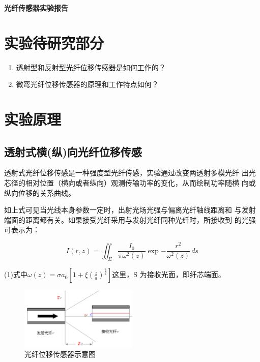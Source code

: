 \documentclass[a4paper,UTF8]{ctexart}
\begin{document}
\begin{center}
    \textbf{\Large 光纤传感器实验报告}
    \par {}
\end{center}

\section{实验待研究部分}

\begin{enumerate}
    \item 透射型和反射型光纤位移传感器是如何工作的？
    \item 微弯光纤位移传感器的原理和工作特点如何？
\end{enumerate}

\section{实验原理}

\subsection{透射式横(纵)向光纤位移传感}

透射式光纤位移传感是一种强度型光纤传感，实验通过改变两透射多模光纤
出光芯径的相对位置（横向或者纵向）观测传输功率的变化，从而绘制功率随横
向或纵向位移的关系曲线。

如上式可见当光线本身参数一定时，出射光场光强与偏离光纤轴线距离和
与发射端面的距离都有关。如果接受光纤采用与发射光纤同种光纤时，所接收到
的光强可表示为：

\begin{equation}
    I(r,z) = \iint_{\Sigma} \frac{I_0}{\pi \omega^2(z)} \exp{- \frac{r^2}{\omega^2(z)}} \,ds 
\end{equation}

(1)式中$\omega(z) = \sigma a_0 \left[1+\xi (\frac{z}{a})^{\frac{3}{2}}\right]$这里，S 为接收光面，即纤芯端面。

\begin{figure}[H]
    \centering
    \begin{minipage}[b]{0.9\textwidth}
        \centering
        \includegraphics[width=0.5\textwidth]{./1.png}
        \caption{光纤位移传感器示意图}
    \end{minipage}
\end{figure}
\end{document}
